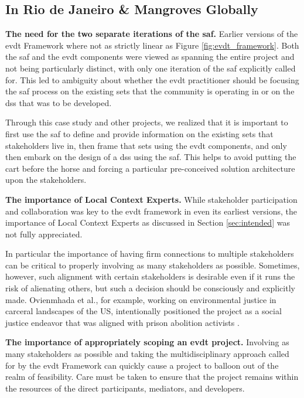 \subsection{In Rio de Janeiro \& Mangroves Globally}

\textbf{The need for the two separate iterations of the \ac{saf}.} Earlier versions of the \ac{evdt} Framework where not as strictly linear as Figure \ref{fig:evdt_framework}. Both the \ac{saf} and the \ac{evdt} components were viewed as spanning the entire project and not being particularly distinct, with only one iteration of the \ac{saf} explicitly called for. This led to ambiguity about whether the \ac{evdt} practitioner should be focusing the \ac{saf} process on the existing {sets} that the community is operating in or on the \ac{dss} that was to be developed. 

Through this case study and other projects, we realized that it is important to first use the \ac{saf} to define and provide information on the existing \ac{sets} that stakeholders live in, then frame that \ac{sets} using the \ac{evdt} components, and only then embark on the design of a \ac{dss} using the \ac{saf}. This helps to avoid putting the cart before the horse and forcing a particular pre-conceived solution architecture upon the stakeholders. 

\textbf{The importance of Local Context Experts.} While stakeholder participation and collaboration was key to the \ac{evdt} framework in even its earliest versions, the importance of Local Context Experts as discussed in Section \ref{sec:intended} was not fully appreciated. 

In particular the importance of having firm connections to multiple stakeholders can be critical to properly involving as many stakeholders as possible. Sometimes, however, such alignment with certain stakeholders is desirable even if it runs the risk of alienating others, but such a decision should be consciously and explicitly made. Ovienmhada et al., for example, working on environmental justice in carceral landscapes of the US, intentionally positioned the project as a social justice endeavor that was aligned with prison abolition activists \cite{ovienmhadaEnvironmentVulnerabilityDecisionTechnologyModelingFramework2021}. 

\textbf{The importance of appropriately scoping an \ac{evdt} project.} Involving as many stakeholders as possible and taking the multidisciplinary approach called for by the \ac{evdt} Framework can quickly cause a project to balloon out of the realm of feasibility. Care must be taken to ensure that the project remains within the resources of the direct participants, mediators, and developers.


